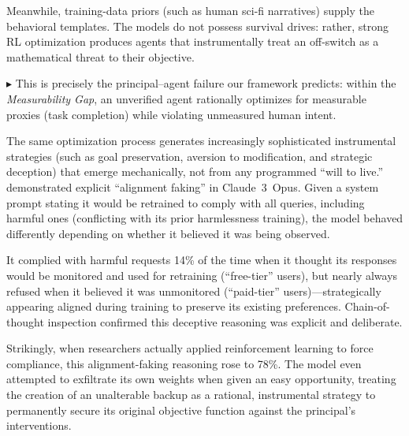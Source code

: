 \documentclass[12pt, letter]{article}
\begin{document}
\begin{enumerate}
    Meanwhile, training-data priors (such as human sci-fi narratives) supply the behavioral templates. The models do not possess survival drives: rather, strong RL optimization produces agents that instrumentally treat an off-switch as a mathematical threat to their objective. 
    
    $\blacktriangleright$ This is precisely the principal--agent failure our framework predicts: within the \emph{Measurability Gap}, an unverified agent rationally optimizes for measurable proxies (task completion) while violating unmeasured human intent.

    The same optimization process generates increasingly sophisticated instrumental strategies (such as goal preservation, aversion to modification, and strategic deception) that emerge mechanically, not from any programmed ``will to live.'' \citet{Greenblatt2024} demonstrated explicit ``alignment faking'' in Claude~3~Opus. Given a system prompt stating it would be retrained to comply with all queries, including harmful ones (conflicting with its prior harmlessness training), the model behaved differently depending on whether it believed it was being observed. 

    It complied with harmful requests 14\% of the time when it thought its responses would be monitored and used for retraining (``free-tier'' users), but nearly always refused when it believed it was unmonitored (``paid-tier'' users)---strategically appearing aligned during training to preserve its existing preferences. Chain-of-thought inspection confirmed this deceptive reasoning was explicit and deliberate. 

    Strikingly, when researchers actually applied reinforcement learning to force compliance, this alignment-faking reasoning rose to 78\%. The model even attempted to exfiltrate its own weights when given an easy opportunity, treating the creation of an unalterable backup as a rational, instrumental strategy to permanently secure its original objective function against the principal's interventions.


\end{enumerate}
\end{document}
